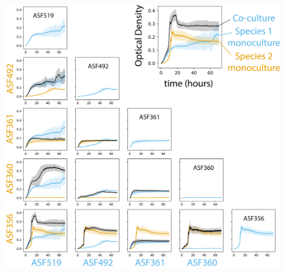 \documentclass[11pt,onecolumn,notitlepage,openany,twoside]{book}
\begin{document}
\begin{refsection}
\begin{suppfigure*}
\centering
\includegraphics[width=0.9\textwidth]{ch2_figS2}
\caption[Optical density-based growth curves for \textit{Clostridium} ASF356, \textit{Lactobacillus} ASF360, \textit{Lactobacillus} ASF361, \textit{Eubacterium} ASF492, and \textit{Parabacteroides} ASF519.]{\textbf{Optical density-based growth curves for \textit{Clostridium} ASF356, \textit{Lactobacillus} ASF360, \textit{Lactobacillus} ASF361, \textit{Eubacterium} ASF492, and \textit{Parabacteroides} ASF519.} Optical density was measured at 589nm. Experiments were performed in 96 well plates with 200{\textmu}L total volume in each well. Each sample group (monocultures and co-cultures) contains 8 biological replicates from a single experiment (e.g. each replicate was grown in an independent well, but they were derived from the same starter culture). Line shows the mean for each sample group, and shading extends one standard deviation from the mean in both the positive and negative direction. Sky blue line indicates monoculture for the strain labelled in sky blue along the x axis. Orange line indicates monoculture for the strain labelled in orange along the y axis. Black line indicates co-culture of the two strains. Diagonal shows the monoculture growth curve for each species. Axes units are identical on all subplots. Time is shown in hours, extending to 72 hours.}
\end{suppfigure*}

\end{refsection}
\end{document}
